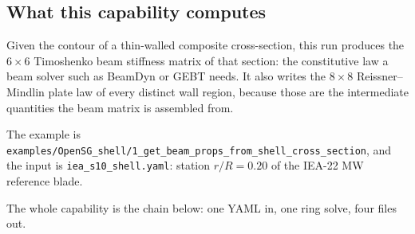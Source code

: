 \subsection{What this capability computes}

Given the contour of a thin-walled composite cross-section, this run produces
the $6\times6$ Timoshenko beam stiffness matrix of that section: the constitutive
law a beam solver such as BeamDyn or GEBT needs. It also writes the
$8\times8$ Reissner--Mindlin plate law of every distinct wall region, because
those are the intermediate quantities the beam matrix is assembled from.

The example is \texttt{examples/OpenSG\_shell/1\_get\_beam\_props\_from\_shell\_cross\_section},
and the input is \texttt{iea\_s10\_shell.yaml}: station $r/R = 0.20$ of the
IEA-22 MW reference blade.

The whole capability is the chain below: one YAML in, one ring solve, four
files out.

